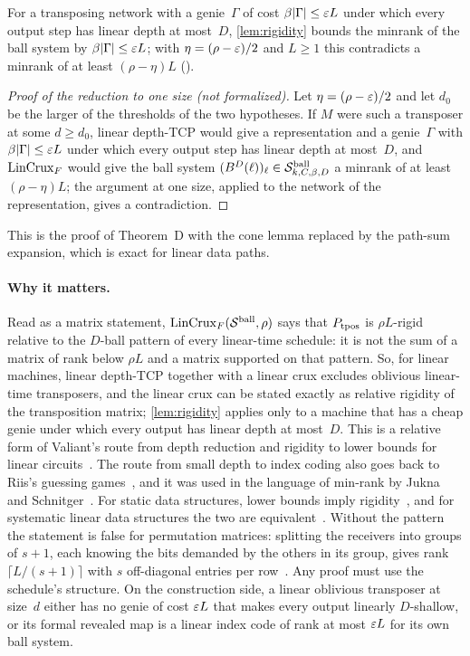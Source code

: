 \begin{outline}
For a transposing network with a genie~$\Gamma$ of cost $\beta\lvert \Gamma \rvert\le\varepsilon L$ under which every output step has
linear depth at most~$D$, \cref{lem:rigidity} bounds the minrank of the ball system by $\beta\lvert \Gamma \rvert\le\varepsilon L$; with
$\eta=(\rho-\varepsilon)/2$ and $L\ge1$ this contradicts a minrank of at least $(\rho-\eta)L$ ().
\end{outline}

\begin{proof}[Proof of the reduction to one size (not formalized)]
Let $\eta=(\rho-\varepsilon)/2$ and let $d_0$ be the larger of the thresholds of the two hypotheses. If $M$ were such a transposer at
some $d\ge d_0$, linear depth-TCP would give a representation and a genie~$\Gamma$ with $\beta\lvert \Gamma \rvert\le\varepsilon L$ under which
every output step has linear depth at most~$D$, and $\mathrm{LinCrux}_F$ would give the ball system
$(B^D(\ell))_\ell\in\mathcal S^{\mathrm{ball}}_{k,C,\beta,D}$ a minrank of at least $(\rho-\eta)L$; the argument at one size, applied to the
network of the representation, gives a contradiction.
\end{proof}

This is the proof of Theorem~D with the cone lemma replaced by the path-sum expansion, which is exact for linear data paths.

\paragraph{Why it matters.} Read as a matrix statement, $\mathrm{LinCrux}_F(\mathcal S^{\mathrm{ball}},\rho)$ says that $P_{\operatorname{tpos}}$ is $\rho L$-rigid
relative to the $D$-ball pattern of every linear-time schedule: it is not the sum of a matrix of rank below $\rho L$ and a
matrix supported on that pattern. So, for linear machines, linear depth-TCP together with a
linear crux excludes oblivious linear-time transposers, and the linear crux can be stated exactly as relative rigidity of the
transposition matrix; \cref{lem:rigidity} applies only to a machine that has a cheap genie under which every output has
linear depth at most~$D$. This is a relative form of Valiant's route from depth reduction and rigidity to lower bounds for
linear circuits~\cite{Valiant1977}. The route from small depth to index coding also goes back to Riis's guessing
games~\cite{Riis2007}, and it was used in the language of min-rank by Jukna and Schnitger~\cite{JuknaSchnitger2011}. For
static data structures, lower bounds imply rigidity~\cite{DGW2019}, and for systematic linear data structures the two are
equivalent~\cite{NRR2020}. Without the pattern the statement is false for permutation matrices: splitting the receivers into
groups of $s+1$, each knowing the bits demanded by the others in its group, gives rank $\lceil L/(s+1)\rceil$ with $s$
off-diagonal entries per row~\cite[Section~4.3]{FourthPaper2026}. Any proof must use the schedule's structure. On the construction
side, a linear oblivious transposer at size~$d$ either has no genie of cost $\varepsilon L$ that makes every output linearly
$D$-shallow, or its formal revealed map is a linear index code of rank at most $\varepsilon L$ for its own ball system.

